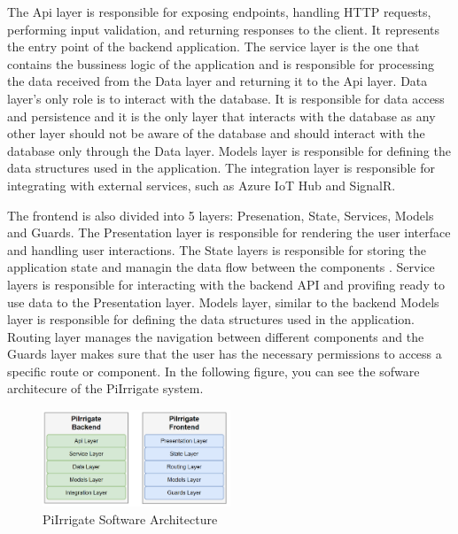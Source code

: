 The Api layer is responsible for exposing endpoints, handling HTTP requests, performing input validation, and 
returning responses to the client. It represents the entry point of the backend application\cite{layerArchitecture}.
The service layer is the one that contains the bussiness logic of the application and 
is responsible for processing the data received from the Data layer and returning it to the Api layer.
Data layer's only role is to interact with the database. It is responsible for data access and persistence and it 
is the only layer that interacts with the database as any other layer should not be aware of the database
and should interact with the database only through the Data layer. Models layer
is responsible for defining the data structures used in the application.
The integration layer is responsible for integrating with external services, such as Azure IoT Hub and SignalR.

The frontend is also divided into 5 layers: Presenation, State, Services, Models and Guards. The Presentation layer 
is responsible for rendering the user interface and handling user interactions. The State layers is responsible for
storing the application state and managin the data flow between the components \cite{ngrxStoreGuide}. 
Service layers is responsible for interacting with the backend API and provifing ready to use data to the Presentation layer.
Models layer, similar to the backend Models layer is responsible for defining the data structures used in the application\cite{typescriptInterfaces}.
Routing layer manages the navigation between different components\cite{angularServices} and the Guards layer makes sure that the user
has the necessary permissions to access a specific route or component\cite{angularGuards}. 
In the following figure, you can see the sofware architecure of the PiIrrigate system.
\begin{figure}[H]
    \centering
    \includegraphics[width=0.5\textwidth]{images/sw-architecture.png}
    \caption{PiIrrigate Software Architecture}
    \label{fig:software-architecture}
\end{figure}

